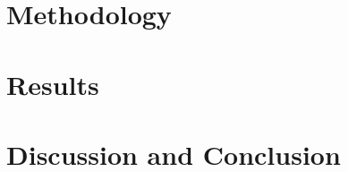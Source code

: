 \documentclass[preprint,11pt,3p]{elsarticle} %
\begin{document}
\section{Methodology}
\label{ch:method}


\section{Results}
\label{ch:results}



% 

\section{Discussion and Conclusion}
\label{ch:conclusion}


% 

% 


   
  
\end{document}
